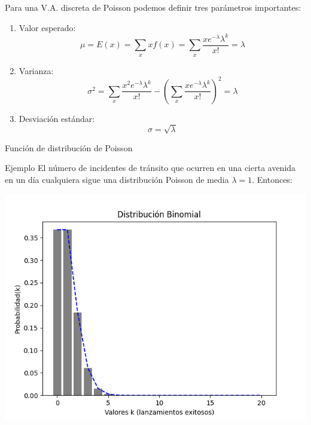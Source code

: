 \documentclass{beamer}
\begin{document}
\begin{frame}
  Para una V.A. discreta de Poisson podemos definir tres parámetros importantes:

  \begin{enumerate}
    \item Valor esperado:
    \begin{equation}
      \mu = E(x) = \sum_{x} xf(x) = \sum_{x} \frac{x e^{-\lambda}\lambda^k}{x!} = \lambda
    \end{equation}

    \item Varianza:
    \begin{equation}
      \sigma^2 = \sum_{x} \frac{x^2 e^{-\lambda}\lambda^k}{x!} - (\sum_{x} \frac{x e^{-\lambda}\lambda^k}{x!})^2 = \lambda
    \end{equation}

    \item Desviación estándar:
    \begin{equation}
      \sigma = \sqrt{\lambda}
    \end{equation}

  \end{enumerate}

\end{frame}

\begin{frame}{Función de distribución de Poisson}
  \begin{block}{Ejemplo}
    El número de incidentes de tránsito que ocurren en una cierta avenida en un día
    cualquiera sigue una distribución Poisson de media $\lambda=1$. Entonces:
  \end{block}

  \begin{center}
    \includegraphics[scale=0.5]{figures/poisson_distribution_lambda_1.png}
  \end{center}
\end{frame}
\end{document}
